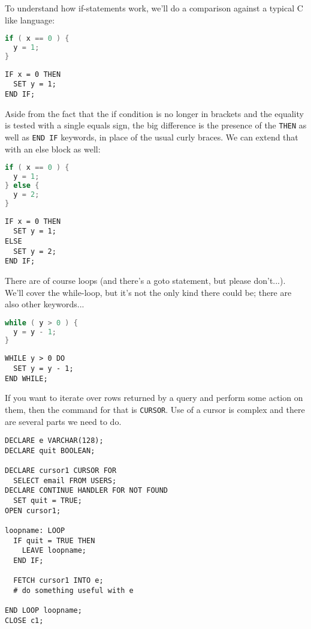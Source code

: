 \documentclass[a4paper]{report}
\begin{document}
To understand how if-statements work, we'll do a comparison against a typical C like language:

\begin{multicols}{2}
\begin{lstlisting}[language=C]
if ( x == 0 ) {
  y = 1;
} 
\end{lstlisting}
\columnbreak
\begin{verbatim}
IF x = 0 THEN
  SET y = 1;
END IF;
\end{verbatim}
\end{multicols}

Aside from the fact that the if condition is no longer in brackets and the equality is tested with a single equals sign, the big difference is the presence of the \texttt{THEN} as well as \texttt{END IF} keywords, in place of the usual curly braces. We can extend that with an else block as well:

\begin{multicols}{2}
\begin{lstlisting}[language=C]
if ( x == 0 ) {
  y = 1;
} else {
  y = 2;
}
\end{lstlisting}
\columnbreak
\begin{verbatim}
IF x = 0 THEN
  SET y = 1;
ELSE
  SET y = 2;
END IF;
\end{verbatim}
\end{multicols}

There are of course loops (and there's a goto statement, but please don't...). We'll cover the while-loop, but it's not the only kind there could be; there are also other keywords...

\begin{multicols}{2}
\begin{lstlisting}[language=C]
while ( y > 0 ) {
  y = y - 1;
} 
\end{lstlisting}
\columnbreak
\begin{verbatim}
WHILE y > 0 DO
  SET y = y - 1;
END WHILE;
\end{verbatim}
\end{multicols}

If you want to iterate over rows returned by a query and perform some action on them, then the command for that is \texttt{CURSOR}. Use of a cursor is complex and there are several parts we need to do.

{\small
\begin{verbatim}
DECLARE e VARCHAR(128);
DECLARE quit BOOLEAN;

DECLARE cursor1 CURSOR FOR 
  SELECT email FROM USERS;
DECLARE CONTINUE HANDLER FOR NOT FOUND
  SET quit = TRUE;  
OPEN cursor1;

loopname: LOOP
  IF quit = TRUE THEN
    LEAVE loopname;
  END IF;

  FETCH cursor1 INTO e;
  # do something useful with e

END LOOP loopname;
CLOSE c1;
\end{verbatim}
}
\end{document}
